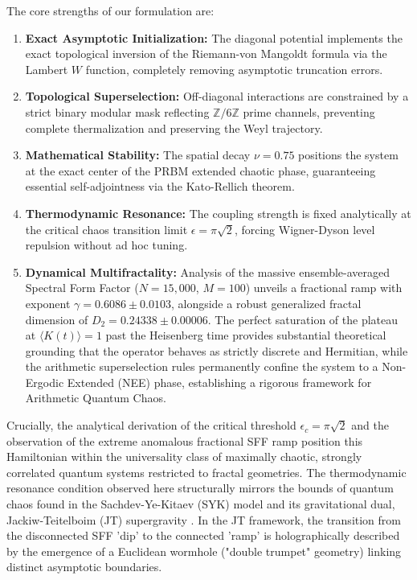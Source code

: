 \documentclass[aps,prl,preprint,superscriptaddress,floatfix]{revtex4-2}
\newcommand{\Zmod}{\mathbb{Z}/6\mathbb{Z}}
\begin{document}
The core strengths of our formulation are:
\begin{enumerate}
    \item \textbf{Exact Asymptotic Initialization:} The diagonal potential implements the exact topological inversion of the Riemann-von Mangoldt formula via the Lambert $W$ function, completely removing asymptotic truncation errors.
    \item \textbf{Topological Superselection:} Off-diagonal interactions are constrained by a strict binary modular mask reflecting $\Zmod$ prime channels, preventing complete thermalization and preserving the Weyl trajectory.
    \item \textbf{Mathematical Stability:} The spatial decay $\nu = 0.75$ positions the system at the exact center of the PRBM extended chaotic phase, guaranteeing essential self-adjointness via the Kato-Rellich theorem.
    \item \textbf{Thermodynamic Resonance:} The coupling strength is fixed analytically at the critical chaos transition limit $\epsilon = \pi \sqrt{2}$, forcing Wigner-Dyson level repulsion without ad hoc tuning.
    \item \textbf{Dynamical Multifractality:} Analysis of the massive ensemble-averaged Spectral Form Factor ($N=15,000$, $M=100$) unveils a fractional ramp with exponent $\gamma = 0.6086 \pm 0.0103$, alongside a robust generalized fractal dimension of $D_2 = 0.24338 \pm 0.00006$. The perfect saturation of the plateau at $\langle K(t) \rangle = 1$ past the Heisenberg time provides substantial theoretical grounding that the operator behaves as strictly discrete and Hermitian, while the arithmetic superselection rules permanently confine the system to a Non-Ergodic Extended (NEE) phase, establishing a rigorous framework for Arithmetic Quantum Chaos.
\end{enumerate}

Crucially, the analytical derivation of the critical threshold $\epsilon_c = \pi\sqrt{2}$ and the observation of the extreme anomalous fractional SFF ramp position this Hamiltonian within the universality class of maximally chaotic, strongly correlated quantum systems restricted to fractal geometries. The thermodynamic resonance condition observed here structurally mirrors the bounds of quantum chaos found in the Sachdev-Ye-Kitaev (SYK) model and its gravitational dual, Jackiw-Teitelboim (JT) supergravity \cite{Saad2019}. In the JT framework, the transition from the disconnected SFF 'dip' to the connected 'ramp' is holographically described by the emergence of a Euclidean wormhole ("double trumpet" geometry) linking distinct asymptotic boundaries.
\end{document}
